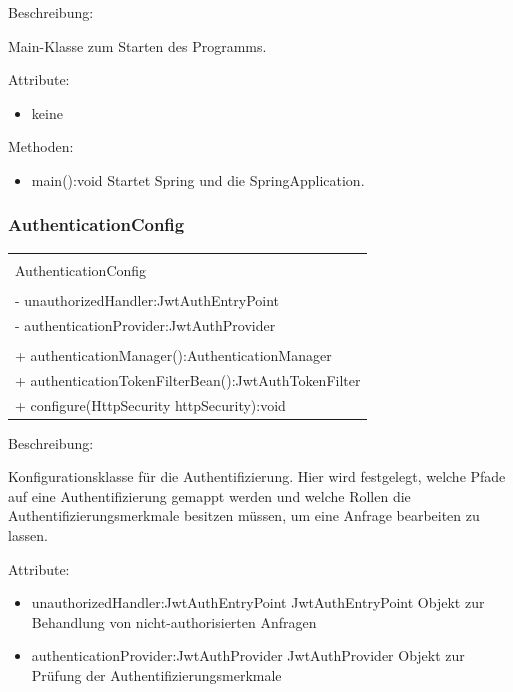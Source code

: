 \documentclass[a4paper,20pt,oneside]{book}
\begin{document}
	\vspace{0.5cm}
	\raggedright
	Beschreibung:
	
	Main-Klasse zum Starten des Programms.
	
	\vspace{0.5cm}
	Attribute:
	\begin{itemize}
	\item keine
	\end{itemize}
	
	Methoden:
	\begin{itemize}
	\item main():void\linebreak
	Startet Spring und die SpringApplication.
	\end{itemize}
	
	\subsubsection{AuthenticationConfig}
	\centering
	\begin{tabular}{|l|}
	\hline \\
	AuthenticationConfig\\
	\hline \\
	- unauthorizedHandler:JwtAuthEntryPoint \\
	- authenticationProvider:JwtAuthProvider \\
	\hline \\
	+ authenticationManager():AuthenticationManager \\
	+ authenticationTokenFilterBean():JwtAuthTokenFilter\\
	+ configure(HttpSecurity httpSecurity):void \\
	\hline 
	\end{tabular}
		
	\vspace{0.5cm}
	\raggedright
	Beschreibung:
	
	Konfigurationsklasse für die Authentifizierung. Hier wird festgelegt, welche Pfade auf eine Authentifizierung gemappt werden und welche Rollen die Authentifizierungsmerkmale besitzen müssen, um eine Anfrage bearbeiten zu lassen.
	
	\vspace{0.5cm}
	Attribute:
	\begin{itemize}
	\item unauthorizedHandler:JwtAuthEntryPoint\linebreak
	JwtAuthEntryPoint Objekt zur Behandlung von nicht-authorisierten Anfragen
	\item authenticationProvider:JwtAuthProvider \linebreak
	JwtAuthProvider Objekt zur Prüfung der Authentifizierungsmerkmale
	\end{itemize}
	
\end{document}
